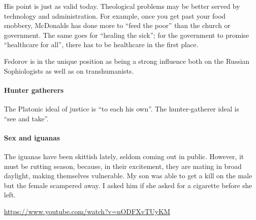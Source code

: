 His point is just as valid today. Theological problems may be better served by technology and administration. For example, once you get past your food snobbery, McDonalds has done more to ``feed the poor'' than the church or government. The same goes for ``healing the sick''; for the government to promise ``healthcare for all'', there has to be healthcare in the first place.

Fedorov is in the unique position as being a strong influence both on the Russian Sophiologists as well as on transhumanists.

\paragraph{Hunter gatherers}


The Platonic ideal of justice is ``to each his own''. The hunter-gatherer ideal is ``see and take''.

\paragraph{Sex and iguanas}


The iguanas have been skittish lately, seldom coming out in public. However, it must be rutting season, because, in their excitement, they are mating in broad daylight, making themselves vulnerable. My son was able to get a kill on the male but the female scampered away. I asked him if she asked for a cigarette before she left.

\url{https://www.youtube.com/watch?v=nODFXvTUyKM}


